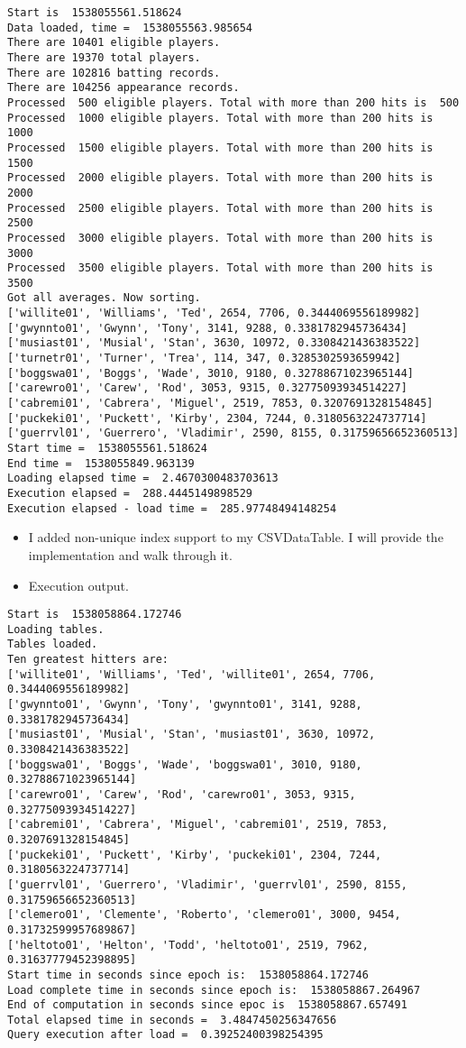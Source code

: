 \documentclass[11pt]{article}
\begin{document}
    \begin{verbatim}
Start is  1538055561.518624
Data loaded, time =  1538055563.985654
There are 10401 eligible players.
There are 19370 total players.
There are 102816 batting records.
There are 104256 appearance records.
Processed  500 eligible players. Total with more than 200 hits is  500
Processed  1000 eligible players. Total with more than 200 hits is  1000
Processed  1500 eligible players. Total with more than 200 hits is  1500
Processed  2000 eligible players. Total with more than 200 hits is  2000
Processed  2500 eligible players. Total with more than 200 hits is  2500
Processed  3000 eligible players. Total with more than 200 hits is  3000
Processed  3500 eligible players. Total with more than 200 hits is  3500
Got all averages. Now sorting.
['willite01', 'Williams', 'Ted', 2654, 7706, 0.3444069556189982]
['gwynnto01', 'Gwynn', 'Tony', 3141, 9288, 0.3381782945736434]
['musiast01', 'Musial', 'Stan', 3630, 10972, 0.3308421436383522]
['turnetr01', 'Turner', 'Trea', 114, 347, 0.3285302593659942]
['boggswa01', 'Boggs', 'Wade', 3010, 9180, 0.32788671023965144]
['carewro01', 'Carew', 'Rod', 3053, 9315, 0.32775093934514227]
['cabremi01', 'Cabrera', 'Miguel', 2519, 7853, 0.3207691328154845]
['puckeki01', 'Puckett', 'Kirby', 2304, 7244, 0.3180563224737714]
['guerrvl01', 'Guerrero', 'Vladimir', 2590, 8155, 0.31759656652360513]
Start time =  1538055561.518624
End time =  1538055849.963139
Loading elapsed time =  2.4670300483703613
Execution elapsed =  288.4445149898529
Execution elapsed - load time =  285.97748494148254
\end{verbatim}

    \begin{itemize}
\item
  I added non-unique index support to my CSVDataTable. I will provide
  the implementation and walk through it.
\item
  Execution output.
\end{itemize}

\begin{verbatim}
Start is  1538058864.172746
Loading tables.
Tables loaded.
Ten greatest hitters are:
['willite01', 'Williams', 'Ted', 'willite01', 2654, 7706, 0.3444069556189982]
['gwynnto01', 'Gwynn', 'Tony', 'gwynnto01', 3141, 9288, 0.3381782945736434]
['musiast01', 'Musial', 'Stan', 'musiast01', 3630, 10972, 0.3308421436383522]
['boggswa01', 'Boggs', 'Wade', 'boggswa01', 3010, 9180, 0.32788671023965144]
['carewro01', 'Carew', 'Rod', 'carewro01', 3053, 9315, 0.32775093934514227]
['cabremi01', 'Cabrera', 'Miguel', 'cabremi01', 2519, 7853, 0.3207691328154845]
['puckeki01', 'Puckett', 'Kirby', 'puckeki01', 2304, 7244, 0.3180563224737714]
['guerrvl01', 'Guerrero', 'Vladimir', 'guerrvl01', 2590, 8155, 0.31759656652360513]
['clemero01', 'Clemente', 'Roberto', 'clemero01', 3000, 9454, 0.31732599957689867]
['heltoto01', 'Helton', 'Todd', 'heltoto01', 2519, 7962, 0.31637779452398895]
Start time in seconds since epoch is:  1538058864.172746
Load complete time in seconds since epoch is:  1538058867.264967
End of computation in seconds since epoc is  1538058867.657491
Total elapsed time in seconds =  3.4847450256347656
Query execution after load =  0.39252400398254395
\end{verbatim}
\end{document}
